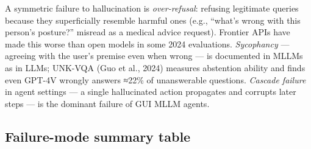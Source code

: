 A symmetric failure to hallucination is \emph{over-refusal}: refusing legitimate queries because they superficially resemble harmful ones (e.g., ``what's wrong with this person's posture?'' misread as a medical advice request). Frontier APIs have made this worse than open models in some 2024 evaluations. \emph{Sycophancy} --- agreeing with the user's premise even when wrong --- is documented in MLLMs as in LLMs; UNK-VQA (Guo et al., 2024) measures abstention ability and finds even GPT-4V wrongly answers ≈22\% of unanswerable questions. \emph{Cascade failure} in agent settings --- a single hallucinated action propagates and corrupts later steps --- is the dominant failure of GUI MLLM agents.

\subsection{Failure-mode summary table}\label{failure-mode-summary-table}

